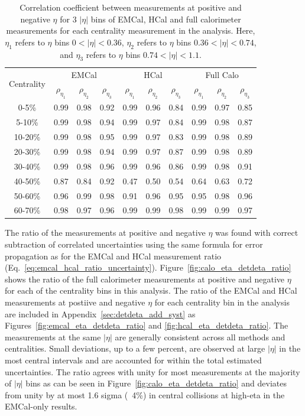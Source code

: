 \begin{table}
    \centering
     \begin{tabular}{c|c|c|c|c|c|c|c|c|c}
    \multirow{2}{*}{Centrality} & \multicolumn{3}{c|}{EMCal} & \multicolumn{3}{c|}{HCal} & \multicolumn{3}{c}{Full Calo} \\
    & $\rho_{\eta_{1}}$ & $\rho_{\eta_{2}}$ & $\rho_{\eta_{3}}$ & $\rho_{\eta_{1}}$ & $\rho_{\eta_{2}}$ & $\rho_{\eta_{3}}$ & $\rho_{\eta_{1}}$ & $\rho_{\eta_{2}}$ & $\rho_{\eta_{3}}$ \\
    \hline
    0-5\%   & 0.99 & 0.98 & 0.92 & 0.99 & 0.96 & 0.84 & 0.99 & 0.97 & 0.85 \\
    5-10\%  & 0.99 & 0.98 & 0.94 & 0.99 & 0.97 & 0.84 & 0.99 & 0.98 & 0.87 \\
    10-20\% & 0.99 & 0.98 & 0.95 & 0.99 & 0.97 & 0.83 & 0.99 & 0.98 & 0.89 \\
    20-30\% & 0.99 & 0.98 & 0.94 & 0.99 & 0.97 & 0.87 & 0.99 & 0.98 & 0.89 \\
    30-40\% & 0.99 & 0.98 & 0.96 & 0.99 & 0.96 & 0.86 & 0.99 & 0.98 & 0.91 \\
    40-50\% & 0.87 & 0.84 & 0.92 & 0.47 & 0.50 & 0.54 & 0.64 & 0.63 & 0.72 \\
    50-60\% & 0.96 & 0.99 & 0.98 & 0.91 & 0.96 & 0.95 & 0.95 & 0.98 & 0.96 \\
    60-70\% & 0.98 & 0.97 & 0.96 & 0.99 & 0.99 & 0.98 & 0.99 & 0.99 & 0.97 \\
    \end{tabular}
    \caption{Correlation coefficient between \detdeta measurements at positive and negative $\eta$ for 3 $|\eta|$ bins of EMCal, HCal and full calorimeter \detdeta measurements for each centrality measurement in the analysis. Here, $\eta_{1}$ refers to $\eta$ bins $0 < |\eta| < 0.36$, $\eta_{2}$ refers to $\eta$ bins $0.36 < |\eta| < 0.74$, and $\eta_{3}$ refers to $\eta$ bins $0.74 < |\eta| < 1.1$.}
    \label{tab:eta_correlation}
\end{table}

The ratio of the \detdeta measurements at positive and negative $\eta$ was found with correct subtraction of correlated uncertainties using the same formula for error propagation as for the EMCal and HCal measurement ratio (Eq.~\ref{eq:emcal_hcal_ratio_uncertainty}). 
Figure~\ref{fig:calo_eta_detdeta_ratio} shows the ratio of the full calorimeter \detdeta measurements at positive and negative $\eta$ for each of the centrality bins in this analysis. 
The ratio of the EMCal and HCal \detdeta measurements at postiive and negative $\eta$ for each centrality bin in the analysis are included in Appendix~\ref{sec:detdeta_add_syst} as Figures~\ref{fig:emcal_eta_detdeta_ratio} and \ref{fig:hcal_eta_detdeta_ratio}.
The measurements at the same $\left|\eta\right|$ are generally consistent across all methods and centralities. 
Small deviations, up to a few percent, are observed at large $\left|\eta\right|$ in the most central intervals and are accounted for within the total estimated uncertainties. 
The ratio agrees with unity for most measurements at the majority of $|\eta|$ bins as can be seen in Figure~\ref{fig:calo_eta_detdeta_ratio} and deviates from unity by at most 1.6 sigma (~4\%) in central collisions at high-eta in the EMCal-only results. 

